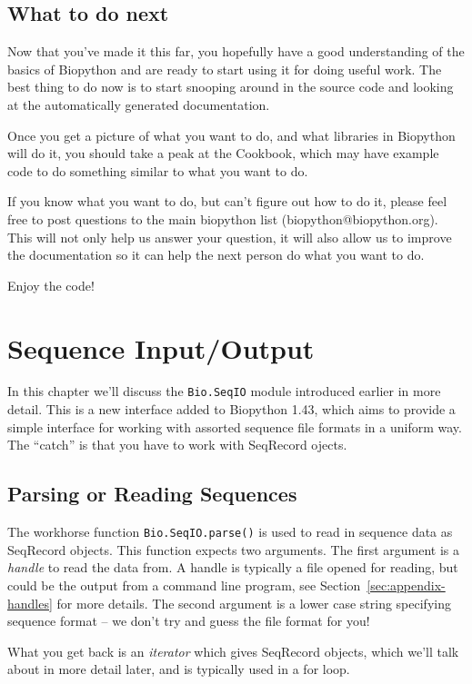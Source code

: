 \documentclass{report}
\begin{document}
\section{What to do next}

Now that you've made it this far, you hopefully have a good understanding of the basics of Biopython and are ready to start using it for doing useful work. The best thing to do now is to start snooping around in the source code and looking at the automatically generated documentation. 

Once you get a picture of what you want to do, and what libraries in Biopython will do it, you should take a peak at the Cookbook, which may have example code to do something similar to what you want to do. 

If you know what you want to do, but can't figure out how to do it, please feel free to post questions to the main biopython list (biopython@biopython.org). This will not only help us answer your question, it will also allow us to improve the documentation so it can help the next person do what you want to do.

Enjoy the code!

\chapter{Sequence Input/Output}
\label{sec:SeqIO}

In this chapter we'll discuss the \verb|Bio.SeqIO| module introduced earlier in more detail.  This is a new interface added to Biopython 1.43, which aims to provide a simple interface for working with assorted sequence file formats in a uniform way.  The ``catch'' is that you have to work with SeqRecord ojects.

\section{Parsing or Reading Sequences}

The workhorse function \verb|Bio.SeqIO.parse()| is used to read in sequence data as SeqRecord objects.  This function expects two arguments. The first argument is a {\it handle} to read the data from. A handle is typically a file opened for reading, but could be the output from a command line program, see Section~\ref{sec:appendix-handles} for more details.  The second argument is a lower case string specifying sequence format -- we don't try and guess the file format for you!

What you get back is an {\it iterator} which gives SeqRecord objects, which we'll talk about in more detail later, and is typically used in a for loop.
\end{document}
